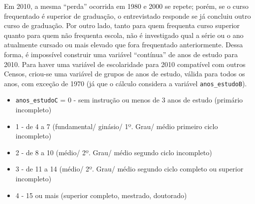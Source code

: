 \documentclass[12pt,a4paper]{article}
\newcommand{\vr}[1]{\texttt{#1}}
\begin{document}
Em 2010, a mesma “perda” ocorrida em 1980 e 2000 se repete; porém, se o curso frequentado é superior de graduação, o entrevistado responde se já concluiu outro curso de graduação. Por outro lado, tanto para quem frequenta curso superior quanto para quem não frequenta escola, não é investigado qual a série ou o ano atualmente cursado ou mais elevado que fora frequentado anteriormente. Dessa forma, é impossível construir uma variável “contínua” de anos de estudo para 2010. Para haver uma variável de escolaridade para 2010 compatível com outros Censos, criou-se uma variável de grupos de anos de estudo, válida para todos os anos, com exceção de 1970 (já que o cálculo considera a variável \vr{anos\_estudoB}).
\begin{itemize}
  \item \vr{anos\_estudoC} = 0 - sem instrução ou menos de 3 anos de estudo (primário incompleto)
  \item 1 - de 4 a 7 (fundamental/ ginásio/ 1º. Grau/ médio primeiro ciclo incompleto)
  \item 2 - de 8 a 10 (médio/ 2º. Grau/ médio segundo ciclo incompleto)
  \item 3 - de 11 a 14 (médio/ 2º. Grau/ médio segundo ciclo completo ou superior incompleto)
  \item 4 - 15 ou mais (superior completo, mestrado, doutorado)
\end{itemize}
\end{document}

